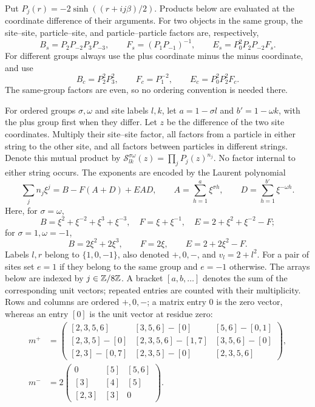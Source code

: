 Put $P_j(r)=-2\sinh((r+ij\beta)/2)$. Products below are evaluated
at the coordinate difference of their arguments. For two objects
in the same group, the site--site, particle--site, and
particle--particle factors are, respectively,
\begin{equation}\label{eq:02-same-factors}
 B_s=P_2P_{-2}P_3P_{-3},\qquad
 F_s=(P_1P_{-1})^{-1},\qquad
 E_s=P_0^2P_2P_{-2}F_s.
\end{equation}
For different groups always use the plus coordinate minus the minus
coordinate, and use
\begin{equation}\label{eq:02-cross-factors}
 B_c=P_2^2P_3^2,\qquad F_c=P_1^{-2},\qquad E_c=P_0^2P_2^2F_c.
\end{equation}
The same-group factors are even, so no ordering convention is needed
there.

For ordered groups $\sigma,\omega$ and site labels $l,k$, let
$a=1-\sigma l$ and $b'=1-\omega k$, with the plus group first
when they differ. Let $z$ be the difference of the two site coordinates.
Multiply their site--site factor, all factors from a particle in either
string to the other site, and all factors between particles in different
strings. Denote this mutual product by
$\mathcal S^{\sigma\omega}_{lk}(z)=\prod_jP_j(z)^{n_j}$.
No factor internal to either string occurs. The exponents are encoded by
the Laurent polynomial
\begin{equation}\label{eq:02-string-polynomial}
 \sum_j n_j\xi^j=B-F(A+D)+EAD,\qquad
 A=\sum_{h=1}^a\xi^{\sigma h},\qquad
 D=\sum_{h=1}^{b'}\xi^{-\omega h}.
\end{equation}
Here, for $\sigma=\omega$,
\[
 B=\xi^2+\xi^{-2}+\xi^3+\xi^{-3},\quad F=\xi+\xi^{-1},\quad
 E=2+\xi^2+\xi^{-2}-F;
\]
for $\sigma=1,\omega=-1$,
\[
 B=2\xi^2+2\xi^3,\qquad F=2\xi,\qquad E=2+2\xi^2-F.
\]
Labels $l,r$ belong to $\{1,0,-1\}$, also denoted $+,0,-$, and
$v_l=2+l^2$. For a pair of sites set $e=1$ if they belong to the
same group and $e=-1$ otherwise. The arrays below are indexed by
$j\in\mathbb Z/8\mathbb Z$. A bracket $[a,b,\ldots]$ denotes the sum of the
corresponding unit vectors; repeated entries are counted with their
multiplicity. Rows and columns are ordered $+,0,-$; a matrix entry $0$ is the zero
vector, whereas an entry $[0]$ is the unit vector at residue zero:
\begin{equation}\label{eq:02-m-arrays}
\begin{split}
 m^+&=\begin{pmatrix}
 [2,3,5,6]&[3,5,6]-[0]&[5,6]-[0,1]\\
 [2,3,5]-[0]&[2,3,5,6]-[1,7]&[3,5,6]-[0]\\
 [2,3]-[0,7]&[2,3,5]-[0]&[2,3,5,6]
 \end{pmatrix},\\
 m^-&=2\begin{pmatrix}
 0 &[5]&[5,6]\\
 [3]&[4]&[5]\\
 [2,3]&[3]&0
 \end{pmatrix}.
\end{split}
\end{equation}
